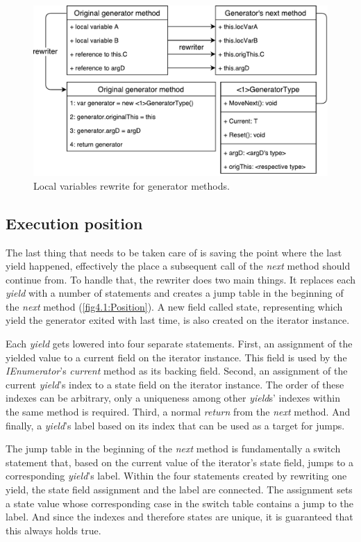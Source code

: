 \begin{figure}[h]
	\centering	
	\includegraphics[scale=0.70]{../img/4_1_localVars}	
	\caption{Local variables rewrite for generator methods.}
	\label{fig4.1:LocVars}
\end{figure}

\subsection{Execution position}

The last thing that needs to be taken care of is saving the point where the last yield happened, effectively the place a subsequent call of the \emph{next} method should continue from. To handle that, the rewriter does two main things. It replaces each \emph{yield} with a number of statements and creates a jump table in the beginning of the \emph{next} method (\autoref{fig4.1:Position}). A new field called state, representing which yield the generator exited with last time, is also created on the iterator instance.

Each \emph{yield} gets lowered into four separate statements. First, an assignment of the yielded value to a current field on the iterator instance. This field is used by the \emph{IEnumerator}'s \emph{current} method as its backing field. Second, an assignment of the current \emph{yield}’s index to a state field on the iterator instance. The order of these indexes can be arbitrary, only a uniqueness among other \emph{yield}s' indexes within the same method is required. Third, a normal \emph{return} from the \emph{next} method. And finally, a \emph{yield}’s label based on its index that can be used as a target for jumps.

The jump table in the beginning of the \emph{next} method is fundamentally a switch statement that, based on the current value of the iterator’s state field, jumps to a corresponding \emph{yield}'s label. Within the four statements created by rewriting one yield, the state field assignment and the label are connected. The assignment sets a state value whose corresponding case in the switch table contains a jump to the label. And since the indexes and therefore states are unique, it is guaranteed that this always holds true.

